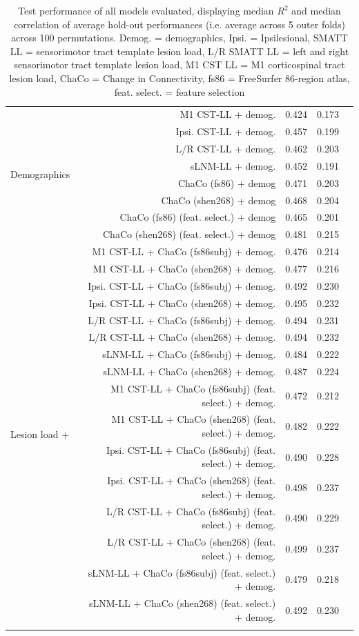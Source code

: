 \documentclass[10pt]{article}
\def\Plus{\texttt{+}}
\begin{document}
\begin{table}[h]
\begin{tabular}{lrrll}
\multirow[t]{8}{*}{Demographics} & M1 CST-LL + demog. & 0.424 & 0.173 \\
 & Ipsi. CST-LL + demog. & 0.457 & 0.199 \\
 & L/R CST-LL + demog. & 0.462 & 0.203 \\
 & sLNM-LL + demog. & 0.452 & 0.191 \\
 & ChaCo (fs86) + demog & 0.471 & 0.203 \\
 & ChaCo (shen268) + demog & 0.468 & 0.204 \\
 & ChaCo (fs86) (feat. select.) + demog & 0.465 & 0.201 \\
 & ChaCo (shen268) (feat. select.) + demog & 0.481 & 0.215 \\
\multirow[t]{16}{*}{Lesion load $\Plus$} & M1 CST-LL + ChaCo (fs86subj) + demog. & 0.476 & 0.214 \\
 ChaCo $\Plus$ & M1 CST-LL + ChaCo (shen268) + demog. & 0.477 & 0.216 \\
 Demographics & Ipsi. CST-LL + ChaCo (fs86subj) + demog. & 0.492 & 0.230 \\
 & Ipsi. CST-LL + ChaCo (shen268) + demog. & 0.495 & 0.232 \\
 & L/R CST-LL + ChaCo (fs86subj) + demog. & 0.494 & 0.231 \\
 & L/R CST-LL + ChaCo (shen268) + demog. & 0.494 & 0.232 \\
 & sLNM-LL + ChaCo (fs86subj) + demog. & 0.484 & 0.222 \\
 & sLNM-LL + ChaCo (shen268) + demog. & 0.487 & 0.224 \\
 & M1 CST-LL + ChaCo (fs86subj) (feat. select.) + demog. & 0.472 & 0.212 \\
 & M1 CST-LL + ChaCo (shen268) (feat. select.) + demog. & 0.482 & 0.222 \\
 & Ipsi. CST-LL + ChaCo (fs86subj) (feat. select.) + demog. & 0.490 & 0.228 \\
 & Ipsi. CST-LL + ChaCo (shen268) (feat. select.) + demog. & 0.498 & 0.237 \\
 & L/R CST-LL + ChaCo (fs86subj) (feat. select.) + demog. & 0.490 & 0.229 \\
 & L/R CST-LL + ChaCo (shen268) (feat. select.) + demog. & 0.499 & 0.237 \\
 & sLNM-LL + ChaCo (fs86subj) (feat. select.) + demog. & 0.479 & 0.218 \\
 & sLNM-LL + ChaCo (shen268) (feat. select.) + demog. & 0.492 & 0.230 \\
 
 \arrayrulecolor{black}\bottomrule
\end{tabular}
\caption{Test performance of all models evaluated, displaying median $R^2$ and median correlation of average hold-out performances (i.e. average across 5 outer folds) across 100 permutations. Demog. = demographics, Ipsi. = Ipsilesional, SMATT LL = sensorimotor tract template lesion load, L/R SMATT LL = left and right sensorimotor tract template lesion load, M1 CST LL = M1 corticospinal tract lesion load, ChaCo = Change in Connectivity, fs86 = FreeSurfer 86-region atlas, feat. select. = feature selection}
\label{results_table_acutechronic}

\end{table}
\end{document}
